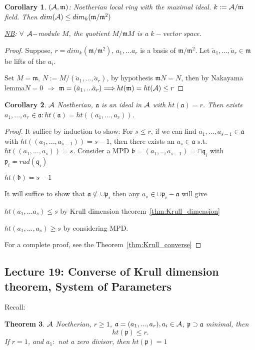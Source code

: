 \documentclass[11pt]{article}
\newtheorem{thm}{Theorem}[section]
\newtheorem{cor}[thm]{Corollary}
\newcommand{\sca}{{\mathfrak a}}
\newcommand{\scb}{{\mathfrak b}}
\newcommand{\scm}{{\mathfrak m}}
\newcommand{\scp}{{\mathfrak p}}
\newcommand{\scq}{\mathfrak q}
\newcommand{\cala}{{\cal A}}
\newcommand{\Lrta}{\Longrightarrow}
\begin{document}
\begin{cor}
$(\cala,\scm)$: Noetherian local ring with the maximal ideal. $k:=\cala/\scm$ field. Then $dim(\cala)\leq dim_k(\scm/\scm^2)$

\underline{NB}: $\forall$ $\cala-$module $M$, the quotient $M/\scm M$ is a $k-$vector space.
\end{cor}
\begin{proof}
Suppose, $r=dim_k(\scm/\scm^2)$, $a_1,...a_r$ is a basis of $\scm/\scm^2$. Let $\tilde{a}_1,...,\tilde{a}_r\in\scm$ be lifts of the $a_i$. 

Set $M=\scm$, $N:=M/(\tilde{a}_1,...,\tilde{a}_r)$, by hypothesis $\scm N=N$, then by Nakayama lemma$N=0$ $\Lrta$ $\scm=(\tilde{a}_1,...\tilde{a}_r)\Lrta ht(\scm)=ht(\cala)\leq r$
\end{proof}

\begin{cor}
$\cala$ Noetherian, $\sca$ is an ideal in $\cala$ with $ht(\sca)=r$. Then exists $a_1,...,a_r\in\sca:ht(\sca)=ht((a_1,...,a_r))$.
\end{cor}
\begin{proof}
It suffice by induction to show: For $s\leq r$, if we can find $a_1,...,a_{s-1}\in\sca$ with $ht((a_1,...,a_{s-1}))=s-1$, then there exists an $a_s\in\sca$ s.t. $ht((a_1,...,a_s))=s$.
Consider a MPD $\scb=(a_1,..,a_{s-1})=\cap\scq_i$ with $\scp_i=rad(\scq_i)$

$ht(\scb)=s-1$

It will suffice to show that $\sca\not\subseteq \cup\scp_i $
then any $a_s\in\cup \scp_i-\sca$ will give 

$ht(a_1,...a_s)\leq s$ by Krull dimension theorem~\ref{thm:Krull_dimension}

$ht(a_1,...,a_s)\geq s$ by considering MPD.

For a complete proof, see the Theorem~\ref{thm:Krull_converse}
\end{proof}



\subsection{Lecture 19: Converse of Krull dimension theorem, System of Parameters}
Recall: 
\begin{thm}\label{thm:thm0}
$\cala$ Noetherian, $r\geq 1$, $\sca=(a_1,...,a_r), a_i\in\cala$, $\scp\supset \sca$ minimal, then 
$$
ht(\scp)\leq r.
$$
If $r=1$, and $a_1:$ not a zero divisor, then $ht(\scp)=1$
\end{thm}
\end{document}
